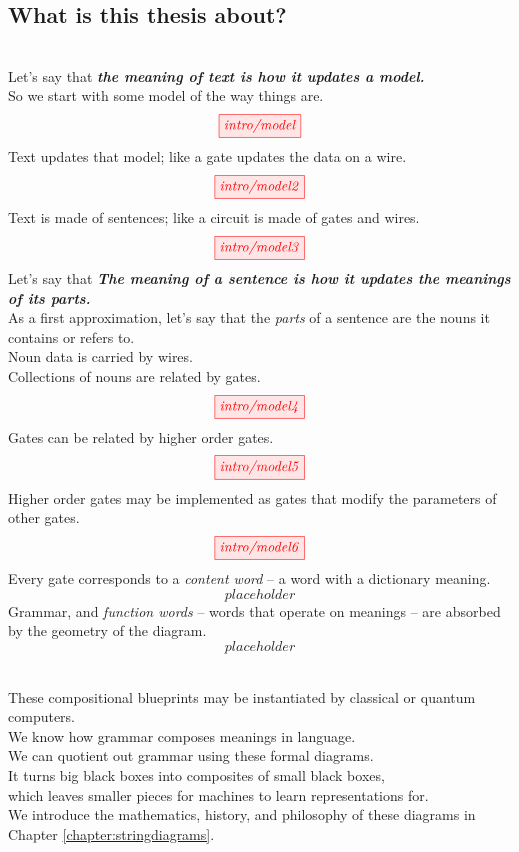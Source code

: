 \begin{fullwidth}
\begin{centering}

\section{What is this thesis about?}

\\
Let's say that \textbf\emph{{the meaning of text is how it updates a model.}}\\
So we start with some model of the way things are.
\[\tikzfig{intro/model}\]
Text updates that model;
like a gate updates the data on a wire.
\[\tikzfig{intro/model2}\]
Text is made of sentences;
like a circuit is made of gates and wires.
\[\tikzfig{intro/model3}\]
Let's say that \textbf{\emph{The meaning of a sentence is how it updates the meanings of its parts.}}\\
As a first approximation, let's say that the \emph{parts} of a sentence are the nouns it contains or refers to.\\
Noun data is carried by wires.\\
Collections of nouns are related by gates.
\[\tikzfig{intro/model4}\]
Gates can be related by higher order gates.
\[\tikzfig{intro/model5}\]
Higher order gates may be implemented as gates that modify the parameters of other gates.
\[\tikzfig{intro/model6}\]
Every gate corresponds to a \emph{content word} -- a word with a dictionary meaning.
\[placeholder\]
Grammar, and \emph{function words} -- words that operate on meanings -- are absorbed by the geometry of the diagram.
\[placeholder\]

\\
These compositional blueprints may be instantiated by classical or quantum computers.\\
We know how grammar composes meanings in language.\\
We can quotient out grammar using these formal diagrams.\\
It turns big black boxes into composites of small black boxes,\\
which leaves smaller pieces for machines to learn representations for.\\
We introduce the mathematics, history, and philosophy of these diagrams in Chapter \ref{chapter:stringdiagrams}.


\end{centering}
\end{fullwidth}
